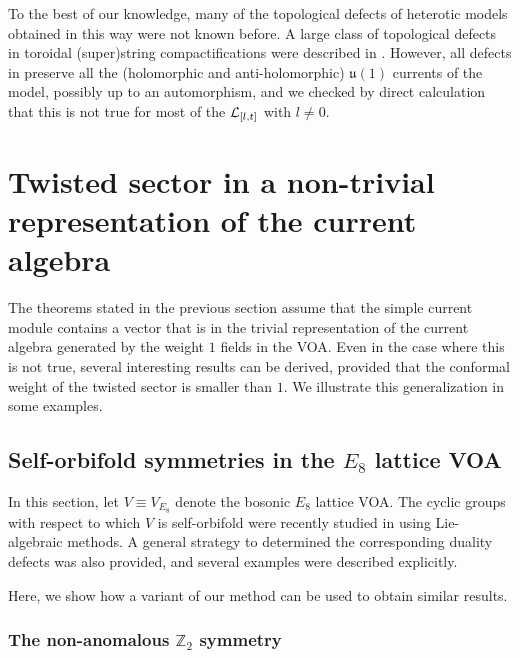 \documentclass[11pt,reqno]{article}
\newcommand{\CL}{{\cal L}}
\newcommand{\ZZ}{\mathbb{Z}}
\newcommand{\alg}[1]{\mathfrak{#1}}
\begin{document}
To the best of our knowledge,  many of the topological defects of heterotic models obtained in this way were not known before. A large class of topological defects in toroidal (super)string compactifications were described in \cite{Bachas:2012bj}. However, all defects in \cite{Bachas:2012bj} preserve all the (holomorphic and anti-holomorphic) $\alg{u}(1)$ currents of the model, possibly up to an automorphism, and we checked by direct calculation that this is not true for most of the $\CL_{[l,t]}$ with $l\neq 0$.



\section{Twisted sector in a non-trivial representation of the current algebra}\label{s:extensions}

The theorems stated in the previous section assume that the simple current module contains a vector that is in the trivial representation of the current algebra generated by the weight $1$ fields in the VOA. Even in the case where this is not true, several interesting results can be derived, provided that the conformal weight of the twisted sector is smaller than $1$. We illustrate this generalization in some examples.

\subsection{Self-orbifold symmetries in the $E_8$ lattice VOA}

In this section, let $V\equiv V_{E_8}$ denote the bosonic $E_8$ lattice VOA. The cyclic groups with respect to which $V$ is self-orbifold were recently studied in \cite{Burbano:2021loy} using Lie-algebraic methods. A general strategy to determined the corresponding duality defects was also provided, and several examples were described explicitly.

Here, we show how a variant of our method can be used to obtain similar results.

\subsubsection{The non-anomalous  $\ZZ_2$ symmetry}
\end{document}
